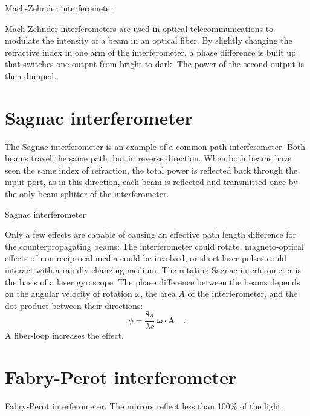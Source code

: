 \begin{marginfigure}
  \caption{Mach-Zehnder interferometer}
\end{marginfigure}


Mach-Zehnder interferometers are used in optical telecommunications to modulate the intensity of a beam in an optical fiber. By slightly changing the refractive index in one arm of the interferometer, a phase difference is built up that switches one output from bright to dark. The power of the second output is then dumped.

\section{Sagnac interferometer}
The Sagnac interferometer is an example of a common-path interferometer. Both beams travel the same path, but in reverse direction. When both beams have seen the same index of refraction, the total power is reflected back through the input port, as in this direction, each beam is reflected and transmitted once by the only beam splitter of the interferometer.


\begin{marginfigure}
  \caption{Sagnac interferometer}
\end{marginfigure}


Only a few effects are capable of causing an effective path length difference for the counterpropagating beams: The interferometer could rotate, magneto-optical effects of non-reciprocal media could be involved, or short laser pulses could interact with a rapidly changing medium. The rotating Sagnac interferometer is the basis of a laser gyroscope. The phase difference between the beams depends on the angular velocity of rotation $\omega$, the area $A$ of the interferometer, and the dot product between their directions:
\begin{equation}
  \phi = \frac{8 \pi}{\lambda c} \, \boldsymbol{\omega} \cdot  \boldsymbol{A}  \quad .
\end{equation}
A fiber-loop increases the effect.


\section{Fabry-Perot interferometer}


\begin{marginfigure}
  \caption{Fabry-Perot interferometer. The mirrors reflect less than 100\% of the light.}
\end{marginfigure}



